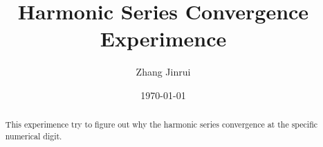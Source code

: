 \documentclass{article}
\title{Harmonic Series Convergence Experimence}
\author{Zhang Jinrui}
\date{\today}
\begin{document}
\maketitle

\begin{abstract}
    This experimence try to figure out why
    the harmonic series convergence at the specific
    numerical digit.
\end{abstract}

\tableofcontents
\newpage


\end{document}
